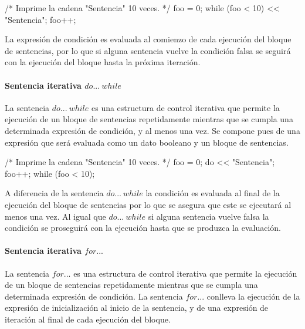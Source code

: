 \begin{myverbatim}
   /*
      Imprime la cadena 
      "Sentencia" 10 veces.
   */
   foo = 0;
   while (foo < 10) {
      << "Sentencia"; 
      foo++;
   }
\end{myverbatim}

La expresión de condición es evaluada al comienzo de cada ejecución del bloque de sentencias, por lo que si alguna sentencia vuelve 
la condición falsa se seguirá con la ejecución del bloque hasta la próxima iteración.

\paragraph{Sentencia iterativa $do...\ while$} \label{sec:stmt_dowhile}

La sentencia $do...\ while$ es una estructura de control iterativa que permite la ejecución de un bloque de 
sentencias repetidamente mientras que se cumpla una determinada expresión de condición, y al menos una vez. Se compone pues de una expresión que será evaluada como 
un dato booleano y un bloque de sentencias. \\


\begin{myverbatim}
   /*
      Imprime la cadena 
      "Sentencia" 10 veces.
   */
   foo = 0;
   do {
      << "Sentencia"; 
      foo++;
   } while (foo < 10);
\end{myverbatim}

A diferencia de la sentencia $do...\ while$ la condición es evaluada al final de la ejecución del bloque de sentencias por lo que se asegura que este
se ejecutará al menos una vez. Al igual que $do...\ while$ si alguna sentencia vuelve falsa la condición se proseguirá con la ejecución hasta que se 
produzca la evaluación.

\paragraph{Sentencia iterativa $for...$} \label{sec:stmt_for}

La sentencia $for...$ es una estructura de control iterativa que permite la ejecución de un bloque de 
sentencias repetidamente mientras que se cumpla una determinada expresión de condición. La sentencia $for...$ conlleva
la ejecución de la expresión de inicialización al inicio de la sentencia, y de una expresión de iteración al final de cada ejecución del
bloque. \\

